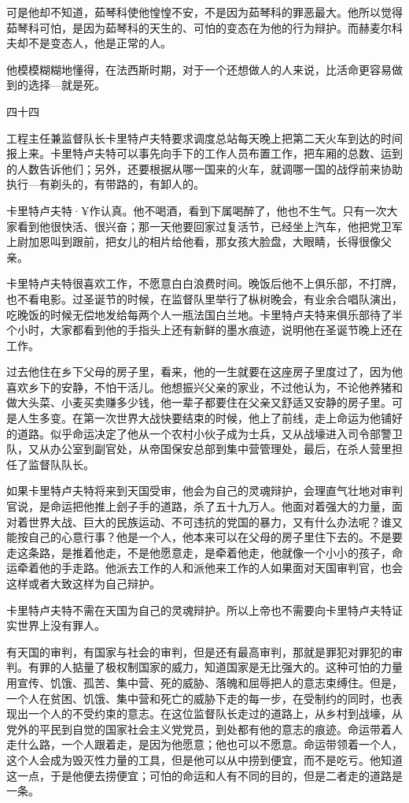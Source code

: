 可是他却不知道，茹琴科使他惶惶不安，不是因为茹琴科的罪恶最大。他所以觉得茹琴科可怕，是因为茹琴科的天生的、可怕的变态在为他的行为辩护。而赫麦尔科夫却不是变态人，他是正常的人。

他模模糊糊地懂得，在法西斯时期，对于一个还想做人的人来说，比活命更容易做到的选择—就是死。

四十四

工程主任兼监督队长卡里特卢夫特要求调度总站每天晚上把第二天火车到达的时间报上来。卡里特卢夫特可以事先向手下的工作人员布置工作，把车厢的总数、运到的人数告诉他们；另外，还要根据从哪一国来的火车，就调哪一国的战俘前来协助执行—有剃头的，有带路的，有卸人的。

卡里特卢夫特·¥作认真。他不喝酒，看到下属喝醉了，他也不生气。只有一次大家看到他很快活、很兴奋；那一天他要回家过复活节，已经坐上汽车，他把党卫军上尉加恩叫到跟前，把女儿的相片给他看，那女孩大脸盘，大眼睛，长得很像父亲。

卡里特卢夫特很喜欢工作，不愿意白白浪费时间。晚饭后他不上俱乐部，不打牌，也不看电影。过圣诞节的时候，在监督队里举行了枞树晚会，有业余合唱队演出，吃晚饭的时候无偿地发给每两个人一瓶法国白兰地。卡里特卢夫特来俱乐部待了半个小时，大家都看到他的手指头上还有新鲜的墨水痕迹，说明他在圣诞节晚上还在工作。

过去他住在乡下父母的房子里，看来，他的一生就要在这座房子里度过了，因为他喜欢乡下的安静，不怕干活儿。他想振兴父亲的家业，不过他认为，不论他养猪和做大头菜、小麦买卖赚多少钱，他一辈子都要住在父亲又舒适又安静的房子里。可是人生多变。在第一次世界大战快要结束的时候，他上了前线，走上命运为他铺好的道路。似乎命运决定了他从一个农村小伙子成为士兵，又从战壕进入司令部警卫队，又从办公室到副官处，从帝国保安总部到集中营管理处，最后，在杀人营里担任了监督队队长。

如果卡里特卢夫特将来到天国受审，他会为自己的灵魂辩护，会理直气壮地对审判官说，是命运把他推上刽子手的道路，杀了五十九万人。他面对着强大的力量，面对着世界大战、巨大的民族运动、不可违抗的党国的暴力，又有什么办法呢？谁又能按自己的心意行事？他是一个人，他本来可以在父母的房子里住下去的。不是要走这条路，是推着他走，不是他愿意走，是牵着他走，他就像一个小小的孩子，命运牵着他的手走路。他派去工作的人和派他来工作的人如果面对天国审判官，也会这样或者大致这样为自己辩护。

卡里特卢夫特不需在天国为自己的灵魂辩护。所以上帝也不需要向卡里特卢夫特证实世界上没有罪人。

有天国的审判，有国家与社会的审判，但是还有最高审判，那就是罪犯对罪犯的审判。有罪的人掂量了极权制国家的威力，知道国家是无比强大的。这种可怕的力量用宣传、饥饿、孤苦、集中营、死的威胁、落魄和屈辱把人的意志束缚住。但是，一个人在贫困、饥饿、集中营和死亡的威胁下走的每一步，在受制约的同时，也表现出一个人的不受约束的意志。在这位监督队长走过的道路上，从乡村到战壕，从党外的平民到自觉的国家社会主义党党员，到处都有他的意志的痕迹。命运带着人走什么路，一个人跟着走，是因为他愿意；他也可以不愿意。命运带领着一个人，这个人会成为毁灭性力量的工具，但是他可以从中捞到便宜，而不是吃亏。他知道这一点，于是他便去捞便宜；可怕的命运和人有不同的目的，但是二者走的道路是一条。

